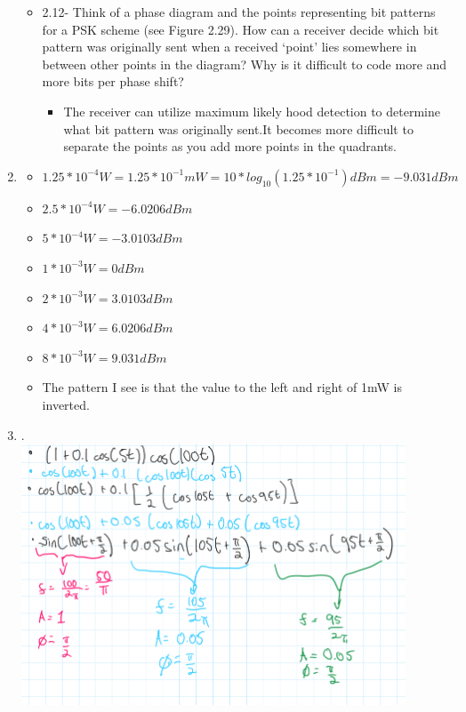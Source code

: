 \documentclass[11pt]{article}
\begin{document}
\begin{enumerate}[label=(\alph*)]
\begin{itemize}
\begin{itemize}
        
    \end{itemize}
  \item 2.12- Think of a phase diagram and the points representing bit patterns for a PSK
scheme (see Figure 2.29). How can a receiver decide which bit pattern was originally sent when a received ‘point’ lies somewhere in between other points in the
diagram? Why is it difficult to code more and more bits per phase shift?
    \begin{itemize}
        \item The receiver can utilize maximum likely hood detection to determine what bit pattern was originally sent.It becomes more difficult to separate the points as you add more points in the quadrants.
    \end{itemize}
\end{itemize}

\item  
\begin{itemize}
    \item {\(1.25*10^{-4}W = 1.25*10^{-1}mW = 10*log_{10}(1.25*10^{-1}) dBm = -9.031 dBm\)}
    \item {\(2.5*10^{-4}W = -6.0206 dBm\)}
    \item {\(5*10^{-4}W = -3.0103 dBm\)}
    \item {\(1*10^{-3}W = 0 dBm\)}
    \item {\(2*10^{-3}W = 3.0103 dBm\)}
    \item {\(4*10^{-3}W = 6.0206 dBm\)}
    \item {\(8*10^{-3}W = 9.031 dBm\)}
    \item The pattern I see is that the value to the left and right of 1mW is inverted.
    
\end{itemize}
\item .\\
\includegraphics[width=0.9\textwidth]{1c}
 

\end{enumerate}
\end{document}
